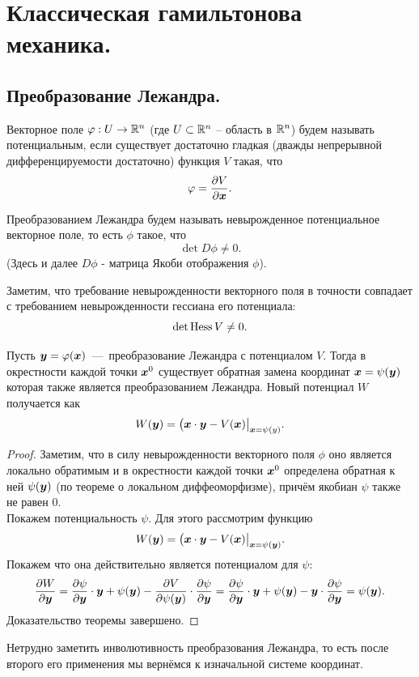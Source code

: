 \section{Классическая гамильтонова механика.}
\subsection{Преобразование Лежандра.}
\begin{definition}
    Векторное поле $\varphi: U \to \mathbb{R}^n$ (где $U \subset \mathbb{R}^n$ -- область в $\mathbb{R}^n$) будем называть потенциальным, если существует достаточно гладкая (дважды непрерывной дифференцируемости достаточно) функция $V$ такая, что
    \[
        \varphi = \dfrac{\partial V}{\partial\boldsymbol{x}}.
    \]
\end{definition}
\begin{definition}
    Преобразованием Лежандра будем называть невырожденное потенциальное векторное поле, то есть $\phi$ такое, что
    \[
        \det D\phi \neq 0.
    \]
    (Здесь и далее $D\phi$ - матрица Якоби отображения $\phi$).
\end{definition}
\begin{note}
    Заметим, что требование невырожденности векторного поля в точности совпадает с требованием невырожденности гессиана его потенциала:
    \[
        \det \operatorname{Hess} V \neq 0.
    \]
\end{note}
\begin{theorem}\label{th:1.1}
    Пусть $\boldsymbol{y} = \varphi(\boldsymbol{x})$~---~преобразование Лежандра с потенциалом $V$.
    Тогда в окрестности каждой точки $\boldsymbol{x}^0$ существует обратная замена координат $\boldsymbol{x} = \psi(\boldsymbol{y})$ которая также является преобразованием Лежандра.
    Новый потенциал $W$ получается как
    \[
        W(\boldsymbol{y}) = \big(\boldsymbol{x} \cdot \boldsymbol{y} - V(\boldsymbol{x})\bigr|_{\boldsymbol{x} = \psi(y)}.
    \]
\end{theorem}
\begin{proof}
    Заметим, что в силу невырожденности векторного поля $\phi$ оно является локально обратимым и в окрестности каждой точки $\boldsymbol{x}^0$ определена обратная к ней $\psi(\boldsymbol{y})$ (по теореме о локальном диффеоморфизме), причём якобиан $\psi$ также не равен 0. \\
    Покажем потенциальность $\psi$.
    Для этого рассмотрим функцию \[W(\boldsymbol{y}) = \big( \boldsymbol{x} \cdot \boldsymbol{y} - V(\boldsymbol{x}) \bigr|_{\boldsymbol{x} = \psi(\boldsymbol{y})}.\]
    Покажем что она действительно является потенциалом для $\psi$:
    \[
        \dfrac{\partial W}{\partial \boldsymbol{y}} = \dfrac{\partial \psi}{\partial \boldsymbol{y}} \cdot \boldsymbol{y} + \psi(\boldsymbol{y}) - \dfrac{\partial V}{\partial \psi(\boldsymbol{y})} \cdot \dfrac{\partial \psi}{\partial \boldsymbol{y}} = \dfrac{\partial \psi}{\partial \boldsymbol{y}} \cdot \boldsymbol{y} + \psi(\boldsymbol{y}) - \boldsymbol{y} \cdot \dfrac{\partial \psi}{\partial \boldsymbol{y}} = \psi(\boldsymbol{y}).
    \]
    Доказательство теоремы завершено.
\end{proof}
\begin{note}
    Нетрудно заметить инволютивность преобразования Лежандра, то есть после второго его применения мы вернёмся к изначальной системе координат.
\end{note}
